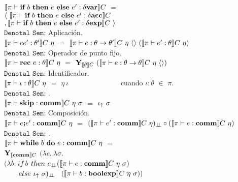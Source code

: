 $\llbracket  \pi \vdash \textbf{if} \ b \ \textbf{then} \ e \ \textbf{else} \ e': \delta \textbf{var} \rrbracket C$ 
$=$ \\ 
\indent \indent \indent 
$\langle \ \llbracket  \pi \vdash \textbf{if} \ b \ \textbf{then} \ e \ \textbf{else} \ e': \delta \textbf{acc} \rrbracket C$\\
\indent \indent \indent 
$, \llbracket  \pi \vdash \textbf{if} \ b \ \textbf{then} \ e \ \textbf{else} \ e': \delta \textbf{exp} \rrbracket C \ \rangle$ \\

\noindent
$\texttt{Denotal Sem:}$ Aplicaci\'on.\\

$\semBrcks{ \pi \vdash ee' : \theta' }C \ \eta$ 
$=$ 
$\llbracket  \pi \vdash e : \theta \rightarrow \theta'  \rrbracket C \ \eta \ \langle  \rangle \
(\llbracket  \pi \vdash e' : \theta  \rrbracket C \ \eta)$\\

\noindent
$\texttt{Denotal Sem:}$ Operador de punto fijo.\\

$\semBrcks{ \pi \vdash \rec e : \theta}C \ \eta$ 
$=$ 
$\Y_{\semBrcks{\theta}C} \ 
(\semBrcks{ \pi \vdash e : \theta \rightarrow \theta}C \ \eta \ \lrangles{})$\\

\noindent
$\texttt{Denotal Sem:}$ Identificador.\\

$\semBrcks{ \pi \vdash \iota : \theta }C \ \eta$ $=$ $\eta \ \iota$
\ \ \ \ \ \ \ \ \ \ \ \ \ \ cuando $\iota:\theta$ $\in$ $\pi$.\\

\noindent
$\texttt{Denotal Sem:}$ \cskip.\\

$\semBrcks{ \pi \vdash \cskip : \commt }C \ \eta \ \sigma$ $=$ $\iota_{\uparrow} \ \sigma$\\

\noindent
$\texttt{Denotal Sem:}$ Composici\'on.\\

$\llbracket  \pi \vdash e \textbf{;} e' : \textbf{comm}  \rrbracket C \ \eta$ 
$=$ 
$(\semBrcks{\pi \vdash e' : \commt}C \ \eta)_{\dbot}
\circ
(\semBrcks{ \pi \vdash e : \commt}C \ \eta)$\\

\noindent
$\texttt{Denotal Sem:}$ \cwhile.\\

$\llbracket  \pi \vdash \textbf{while} \ b \ \textbf{do} \ e : \textbf{comm}  \rrbracket C \ \eta$ 
$=$ \\
\indent \indent \indent
$\textbf{Y}_{\llbracket \textbf{comm} \rrbracket C}$ $(\lambda c . \ \lambda \sigma . \ $\\
\indent \indent \indent \indent \indent \indent
$(\lambda b . \ if \ b $ $then \ c_{\bot \!\!\! \bot} (\llbracket \pi \vdash e : \textbf{comm} \rrbracket C \ \eta \ \sigma)$\\
 \indent \indent  \indent \indent \indent \indent \indent \indent \ \ \ \
$else \ \iota_{\uparrow} \ \sigma)_{\bot \!\!\! \bot}$ \
$(\llbracket  \pi \vdash b : \textbf{boolexp} \rrbracket C \ \eta \ \sigma))$\\


